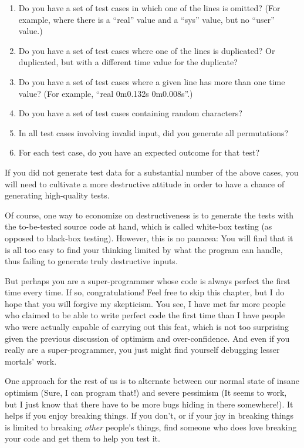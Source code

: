 {\begin{enumerate}
		times is non-numeric?  (For example, ``Go Fish''.)
	\item	Do you have a set of test cases in which one of the
		lines is omitted?  (For example, where there is a
		``real'' value and a ``sys'' value, but no ``user''
		value.)
	\item	Do you have a set of test cases where one of the
		lines is duplicated?  Or duplicated, but with a
		different time value for the duplicate?
	\item	Do you have a set of test cases where a given line
		has more than one time value?  (For example,
		``real 0m0.132s 0m0.008s''.)
	\item	Do you have a set of test cases containing random
		characters?
	\item	In all test cases involving invalid input, did you
		generate all permutations?
	\item	For each test case, do you have an expected outcome
		for that test?
	\end{enumerate}

	If you did not generate test data for a substantial number of
	the above cases, you will need to cultivate a more destructive
	attitude in order to have a chance of generating high-quality
	tests.

	Of course, one way to economize on destructiveness is to
	generate the tests with the to-be-tested source code at hand,
	which is called white-box testing (as opposed to black-box testing).
	However, this is no panacea: You will find that it is all too
	easy to find your thinking limited by what the program can handle,
	thus failing to generate truly destructive inputs.
} \QuickQuizEnd

But perhaps you are a super-programmer whose code is always perfect
the first time every time.
If so, congratulations!
Feel free to skip this chapter, but
I do hope that you will forgive my skepticism.
You see, I have met far more people who claimed to be able
to write perfect code the first time than I have
people who were actually capable of carrying out this feat, which
is not too surprising given the previous discussion of optimism
and over-confidence.
And even if you really are a super-programmer, you just might
find yourself debugging lesser mortals' work.

One approach for the rest of us is to alternate between our normal
state of insane optimism
(Sure, I can program that!) and severe pessimism
(It seems to work, but I just know that there have to be more bugs hiding
in there somewhere!).
It helps if you enjoy breaking things.
If you don't, or if your joy in breaking things is limited to breaking
\emph{other} people's things, find someone who does love breaking your
code and get them to help you test it.

